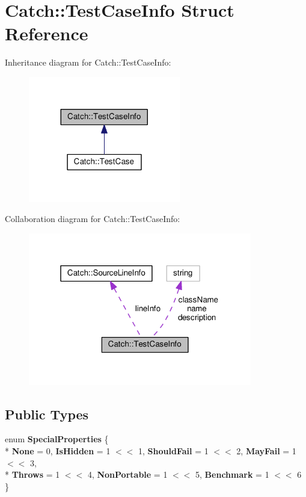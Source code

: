 \hypertarget{structCatch_1_1TestCaseInfo}{}\section{Catch\+:\+:Test\+Case\+Info Struct Reference}
\label{structCatch_1_1TestCaseInfo}


Inheritance diagram for Catch\+:\+:Test\+Case\+Info\+:
\nopagebreak
\begin{figure}[H]
\begin{center}
\leavevmode
\includegraphics[width=188pt]{structCatch_1_1TestCaseInfo__inherit__graph}
\end{center}
\end{figure}


Collaboration diagram for Catch\+:\+:Test\+Case\+Info\+:
\nopagebreak
\begin{figure}[H]
\begin{center}
\leavevmode
\includegraphics[width=277pt]{structCatch_1_1TestCaseInfo__coll__graph}
\end{center}
\end{figure}
\subsection*{Public Types}
\begin{DoxyCompactItemize}
\item 
enum {\bfseries Special\+Properties} \{ \\*
{\bfseries None} = 0, 
{\bfseries Is\+Hidden} = 1 $<$$<$ 1, 
{\bfseries Should\+Fail} = 1 $<$$<$ 2, 
{\bfseries May\+Fail} = 1 $<$$<$ 3, 
\\*
{\bfseries Throws} = 1 $<$$<$ 4, 
{\bfseries Non\+Portable} = 1 $<$$<$ 5, 
{\bfseries Benchmark} = 1 $<$$<$ 6
 \}\hypertarget{structCatch_1_1TestCaseInfo_a39b232f74b4a7a6f2183b96759027eac}{}\label{structCatch_1_1TestCaseInfo_a39b232f74b4a7a6f2183b96759027eac}

\end{DoxyCompactItemize}
